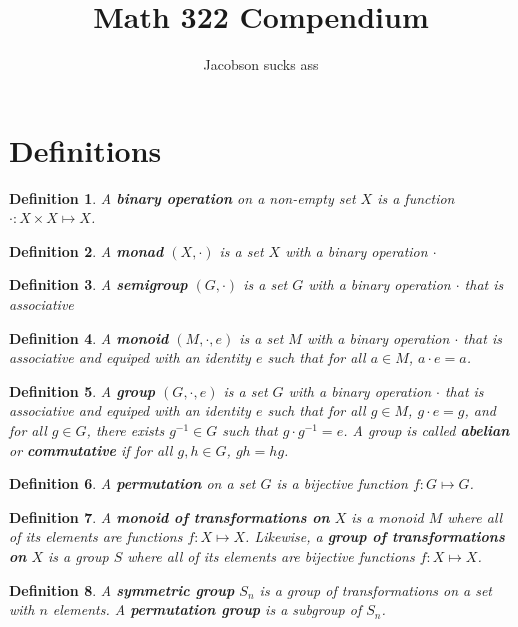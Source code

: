 \documentclass{article}
\title{Math 322 Compendium}
\author{Jacobson sucks ass}
\newtheorem{definition}{Definition}
\theoremstyle{definition}
\begin{document}
\maketitle
\theoremstyle{definition}
\newtheorem{exmp}{Example}
\newtheorem{prop}{Proposition}
\newtheorem{fact}{Fact}
\newtheorem*{remark}{Remark}
\pagebreak
\section{Definitions}
\begin{definition}
    A \textbf{binary operation} on a non-empty set $X$ is a function $\cdot : X \times X \mapsto X$.
\end{definition}
\begin{definition}
    A \textbf{monad} $(X,\cdot)$ is a set $X$ with a binary operation $\cdot$
\end{definition}
\begin{definition}
    A \textbf{semigroup} $(G,\cdot)$ is a set $G$ with a binary operation $\cdot$ that is associative
\end{definition}
\begin{definition}
    A \textbf{monoid} $(M,\cdot,e)$ is a set $M$ with a binary operation $\cdot$ that is associative and equiped with an identity $e$ such that for all $a \in M$, $a\cdot e = a$.
\end{definition}
\begin{definition}
    A \textbf{group} $(G,\cdot,e)$ is a set $G$ with a binary operation $\cdot$ that is associative and equiped with an identity $e$ such that for all $g \in M$, $g\cdot e = g$, and for all $g \in G$, there exists $g^{-1} \in G$ such that $g\cdot g^{-1} = e$. A group is called \textbf{abelian} or \textbf{commutative} if for all $g,h \in G$, $gh=hg$.
\end{definition}
\begin{definition}
    A \textbf{permutation} on a set $G$ is a bijective function $f: G \mapsto G$.
\end{definition}
\begin{definition}
    A \textbf{monoid of transformations on} $X$ is a monoid $M$ where all of its elements are functions $f:X \mapsto X$. Likewise, a \textbf{group of transformations on} $X$ is a group $S$ where all of its elements are bijective functions $f:X \mapsto X$.
\end{definition}
\begin{definition}
    A \textbf{symmetric group} $S_n$ is a group of transformations on a set with $n$ elements. A \textbf{permutation group} is a subgroup of $S_n$.
\end{definition}
\end{document}
